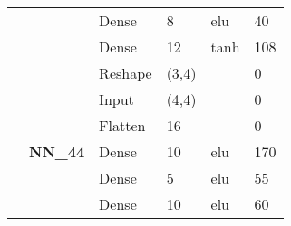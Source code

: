 \begin{table}[H]
\begin{center}
\begin{tabular}{ll|l|l|l|l|}
\multicolumn{1}{|l|}{}                                                                        &                                  & Dense                              & 8                                    & elu                                     & 40                                          \\ \cline{3-6} 
\multicolumn{1}{|l|}{}                                                                        &                                  & Dense                              & 12                                   & tanh                                     & 108                                         \\ \cline{3-6} 
\multicolumn{1}{|l|}{}                                                                        &                                  & Reshape                            & (3,4)                                &                                          & 0                                           \\ \cline{2-6} 
\multicolumn{1}{|l|}{}                                                                        & \multirow{7}{*}{\textbf{NN\_44}} & Input                              & (4,4)                                &                                          & 0                                           \\ \cline{3-6} 
\multicolumn{1}{|l|}{}                                                                        &                                  & Flatten                            & 16                                   &                                          & 0                                           \\ \cline{3-6} 
\multicolumn{1}{|l|}{}                                                                        &                                  & Dense                              & 10                                   & elu                                     & 170                                         \\ \cline{3-6} 
\multicolumn{1}{|l|}{}                                                                        &                                  & Dense                              & 5                                    & elu                                     & 55                                          \\ \cline{3-6} 
\multicolumn{1}{|l|}{}                                                                        &                                  & Dense                              & 10                                   & elu                                     & 60                                          \\ \cline{3-6} 

\end{tabular}
\end{center}
\end{table}
